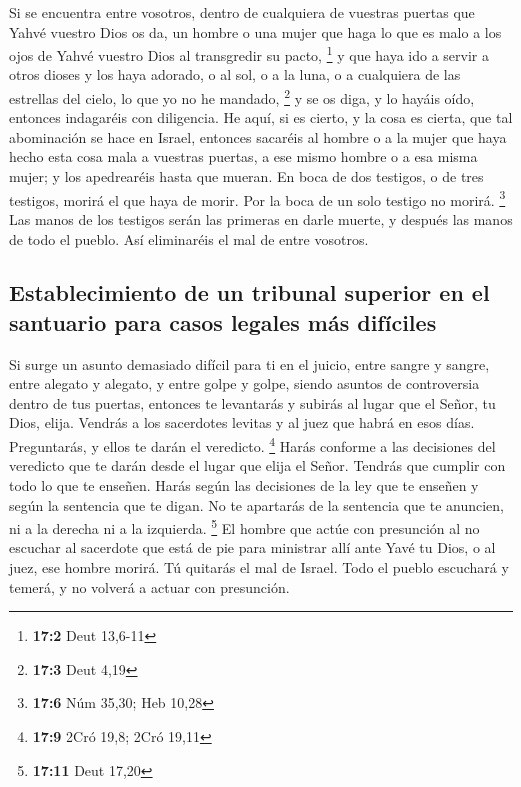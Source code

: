 \begin{paracol}{2}
 Si se encuentra entre vosotros, dentro de cualquiera de
vuestras puertas que Yahvé vuestro Dios os da, un hombre o una mujer que
haga lo que es malo a los ojos de Yahvé vuestro Dios al transgredir su
pacto, \footnote{\textbf{17:2} Deut 13,6-11}  y que haya
ido a servir a otros dioses y los haya adorado, o al sol, o a la luna, o
a cualquiera de las estrellas del cielo, lo que yo no he mandado,
\footnote{\textbf{17:3} Deut 4,19}  y se os diga, y lo
hayáis oído, entonces indagaréis con diligencia. He aquí, si es cierto,
y la cosa es cierta, que tal abominación se hace en Israel,
 entonces sacaréis al hombre o a la mujer que haya hecho
esta cosa mala a vuestras puertas, a ese mismo hombre o a esa misma
mujer; y los apedrearéis hasta que mueran.  En boca de dos
testigos, o de tres testigos, morirá el que haya de morir. Por la boca
de un solo testigo no morirá. \footnote{\textbf{17:6} Núm 35,30; Heb
  10,28}  Las manos de los testigos serán las primeras en
darle muerte, y después las manos de todo el pueblo. Así eliminaréis el
mal de entre vosotros.

\hypertarget{establecimiento-de-un-tribunal-superior-en-el-santuario-para-casos-legales-muxe1s-difuxedciles}{%
\subsection{Establecimiento de un tribunal superior en el santuario para
casos legales más
difíciles}\label{establecimiento-de-un-tribunal-superior-en-el-santuario-para-casos-legales-muxe1s-difuxedciles}}

 Si surge un asunto demasiado difícil para ti en el
juicio, entre sangre y sangre, entre alegato y alegato, y entre golpe y
golpe, siendo asuntos de controversia dentro de tus puertas, entonces te
levantarás y subirás al lugar que el Señor, tu Dios, elija.
 Vendrás a los sacerdotes levitas y al juez que habrá en
esos días. Preguntarás, y ellos te darán el veredicto. \footnote{\textbf{17:9}
  2Cró 19,8; 2Cró 19,11}  Harás conforme a las decisiones
del veredicto que te darán desde el lugar que elija el Señor. Tendrás
que cumplir con todo lo que te enseñen.  Harás según las
decisiones de la ley que te enseñen y según la sentencia que te digan.
No te apartarás de la sentencia que te anuncien, ni a la derecha ni a la
izquierda. \footnote{\textbf{17:11} Deut 17,20}  El
hombre que actúe con presunción al no escuchar al sacerdote que está de
pie para ministrar allí ante Yavé tu Dios, o al juez, ese hombre morirá.
Tú quitarás el mal de Israel.  Todo el pueblo escuchará y
temerá, y no volverá a actuar con presunción.


\end{paracol}

